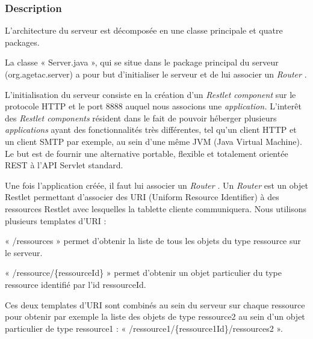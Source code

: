 \documentclass{article}
\begin{document}
\vspace{27pt}
\subsubsection*{{\color{color02} \textbf{Description}}}

\vspace{13pt}
\leftskip=0pt
{\color{color01} L'architecture du serveur est décomposée en une classe principale 
et quatre packages.}

\vspace{13pt}
{\color{color01} La classe « Server.java », qui se situe dans le package principal 
du serveur (org.agetac.server) a pour but d'initialiser le serveur et de lui associer 
un }{\color{color01} \textit{Router}}{\color{color01} .}

{\color{color01} L'initialisation du serveur consiste en la création d'un }{\color{color01} \textit{Restlet 
component }}{\color{color01} sur le protocole HTTP et le port 8888 auquel nous 
associons une }{\color{color01} \textit{application. }}{\color{color01} L'interêt 
des }{\color{color01} \textit{Restlet components}}{\color{color01}  résident dans 
le fait de pouvoir héberger plusieurs }{\color{color01} \textit{applications}}{\color{color01}  
ayant des fonctionnalités très différentes, tel qu'un client HTTP et un client 
SMTP par exemple, au sein d'une même JVM (Java Virtual Machine). Le but est de 
fournir une alternative portable, flexible et totalement orientée REST à l'API 
Servlet standard.}

{\color{color01} Une fois l'application créée, il faut lui associer un }{\color{color01} \textit{Router}}{\color{color01} . 
Un }{\color{color01} \textit{Router }}{\color{color01} est un objet Restlet permettant 
d'associer des URI (Uniform Resource Identifier) à des ressources Restlet avec 
lesquelles la tablette cliente communiquera. Nous utilisons plusieurs templates 
d'URI :}

\leftskip=36pt
\parindent=-18pt
{\color{color01} « /ressources » permet d'obtenir la liste de tous les objets 
du type ressource sur le serveur.}

{\color{color01} « /ressource/\{ressourceId\} »  permet d'obtenir un objet particulier 
du type ressource identifié par l'id ressourceId.}

\leftskip=0pt
\parindent=0pt
{\color{color01} Ces deux templates d'URI sont combinés au sein du serveur sur 
chaque ressource pour obtenir par exemple la liste des objets de type ressource2 
au sein d'un objet particulier de type ressource1 : « /ressource1/\{ressource1Id\}/ressources2 
».}
\end{document}
